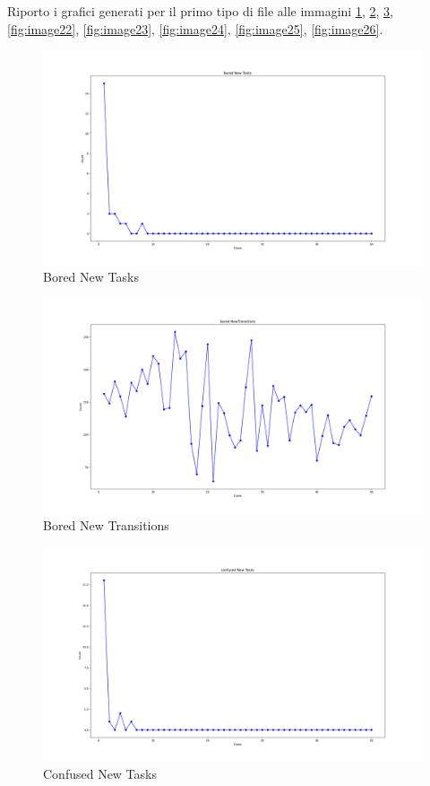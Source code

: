 Riporto i grafici generati per il primo tipo di file alle immagini \ref{fig:image19},  \ref{fig:image20},  \ref{fig:image21},  \ref{fig:image22},  \ref{fig:image23},  \ref{fig:image24},  \ref{fig:image25},  \ref{fig:image26}.
\newpage
\begin{figure}  
    \centering
    \includegraphics[width=1\linewidth]{images/bored New Tasks.png}
    \caption{Bored New Tasks}
    \label{fig:image19}
\end{figure}
\begin{figure}
    \centering   
    \includegraphics[width=1\linewidth]{images/bored NewTransitions.png}
    \caption{Bored New Transitions}
    \label{fig:image20}
\end{figure}\clearpage
\begin{figure}
    \centering   
    \includegraphics[width=1\linewidth]{images/confused New Tasks.png}
    \caption{Confused New Tasks}
    \label{fig:image21}
\end{figure}
